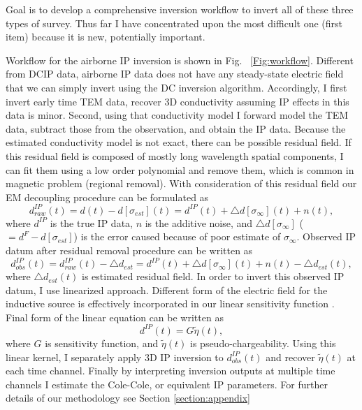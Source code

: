 \documentclass[letterpaper,11pt]{article}
\newcommand{\siginf}{\sigma_\infty}
\newcommand{\peta}{\tilde{\eta}}
\newcommand{\dip}{d^{IP}}
\begin{document}
Goal is to develop a comprehensive inversion workflow to invert all of these three types of survey. Thus far I have concentrated upon the most difficult one (first item) because it is new, potentially important. 

Workflow for the airborne IP inversion is shown in Fig. ~\ref{Fig:workflow}. Different from DCIP data, airborne IP data does not have any steady-state electric field that we can simply invert using the DC inversion algorithm. Accordingly, I first invert early time TEM data, recover 3D conductivity assuming IP effects in this data is minor. Second, using that conductivity model I forward model the TEM data, subtract those from the observation, and obtain the IP data. Because the estimated conductivity model is not exact, there can be possible residual field. If this residual field is composed of mostly long wavelength spatial components, I can fit them using a low order polynomial and remove them, which is common in magnetic problem (regional removal). With consideration of this residual field our EM decoupling procedure can be formulated as 
\begin{equation}
  \dip_{raw}(t) = d(t) - d[\sigma_{est}](t) = \dip(t) + \triangle d[\siginf](t) + n(t),
  \label{eq: IPdatum_raw}
\end{equation}
where $\dip$ is the true IP data, $n$ is the additive noise, and $\triangle d[\siginf]$ ($=d^{F}-d[\sigma_{est}]$) is the error caused because of poor estimate of $\siginf$. 
Observed IP datum after residual removal procedure can be written as 
\begin{equation}
  \dip_{obs}(t) = \dip_{raw}(t) - \triangle d_{est} = \dip(t) + \triangle d[\siginf](t) + n(t) - \triangle d_{est}(t),
  \label{eq: IPdatum_obs}
\end{equation}
where $\triangle d_{est}(t)$ is estimated residual field. 
In order to invert this observed IP datum, I use linearized approach. Different form of the electric field for the inductive source is effectively incorporated in our linear sensitivity function \cite[]{Kang2015c}. Final form of the linear equation can be written as 
\begin{equation}
  \dip(t) = G\peta(t),
  \label{eq:linearIPdatum}
\end{equation}
where $G$ is sensitivity function, and $\peta(t)$ is pseudo-chargeability. Using this linear kernel, I separately apply 3D IP inversion to $\dip_{obs}(t)$ and recover $\peta(t)$ at each time channel. Finally by interpreting inversion outputs at multiple time channels I estimate the Cole-Cole, or equivalent IP parameters. For further details of our methodology see Section \ref{section:appendix}
\end{document}
